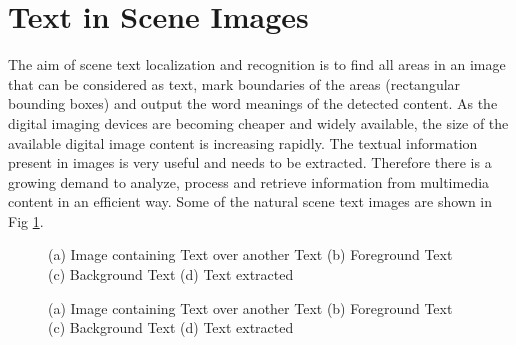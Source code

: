 


\section{Text in Scene Images}

The aim of scene text localization and recognition is to find all areas in
an image that can be considered as text, mark
boundaries of the areas (rectangular bounding boxes) and output the word meanings of the detected content.
As the digital imaging devices are becoming cheaper and widely available, 
the size of the available digital image content is increasing rapidly.
The textual information present in images is very useful and needs to be extracted.
Therefore there is a growing demand to analyze, process and retrieve information
from multimedia content in an efficient way.
Some of the natural scene text images are shown in Fig \ref{}.

\begin{figure}[t]
\centering
{}
\caption
{(a) Image containing Text over another Text (b) Foreground Text (c) Background Text (d)
Text extracted}
\end{figure}

\begin{figure}[t]
\centering
{}
\caption
{(a) Image containing Text over another Text (b) Foreground Text (c) Background Text (d)
Text extracted}
\end{figure}

